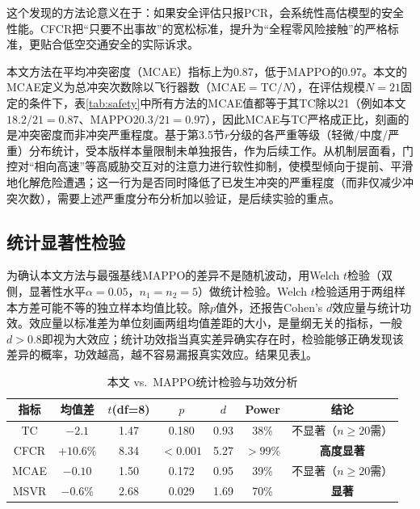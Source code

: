 \documentclass[12pt,a4paper,UTF8]{ctexart}
\begin{document}
这个发现的方法论意义在于：如果安全评估只报PCR，会系统性高估模型的安全性能。CFCR把“只要不出事故”的宽松标准，提升为“全程零风险接触”的严格标准，更贴合低空交通安全的实际诉求。

本文方法在平均冲突密度（MCAE）指标上为0.87，低于MAPPO的0.97。本文的MCAE定义为总冲突次数除以飞行器数（$\mathrm{MCAE}=\mathrm{TC}/N$），在评估规模$N=21$固定的条件下，表\ref{tab:safety}中所有方法的MCAE值都等于其TC除以21（例如本文$18.2/21=0.87$、MAPPO$20.3/21=0.97$），因此MCAE与TC严格成正比，刻画的是冲突密度而非冲突严重程度。基于第3.5节$r$分级的各严重等级（轻微/中度/严重）分布统计，受本版样本量限制未单独报告，作为后续工作。从机制层面看，门控对“相向高速”等高威胁交互对的注意力进行软性抑制，使模型倾向于提前、平滑地化解危险遭遇；这一行为是否同时降低了已发生冲突的严重程度（而非仅减少冲突次数），需要上述严重度分布分析加以验证，是后续实验的重点。

\subsection{统计显著性检验}

为确认本文方法与最强基线MAPPO的差异不是随机波动，用Welch $t$检验\cite{ref42}（双侧，显著性水平$\alpha=0.05$，$n_1=n_2=5$）做统计检验。Welch $t$检验适用于两组样本方差可能不等的独立样本均值比较。除$p$值外，还报告Cohen's $d$效应量\cite{ref43}与统计功效。效应量以标准差为单位刻画两组均值差距的大小，是量纲无关的指标，一般$d>0.8$即视为大效应；统计功效指当真实差异确实存在时，检验能够正确发现该差异的概率，功效越高，越不容易漏报真实效应。结果见表\ref{tab:ttest}。

\begin{table}[H]
    \centering
    \caption{本文 vs.\ MAPPO统计检验与功效分析}
    \label{tab:ttest}
    \begin{tabular}{|c|c|c|c|c|c|c|}
        \hline
        \textbf{指标} & \textbf{均值差} & \textbf{$t$(df=8)} & \textbf{$p$} & \textbf{$d$} & \textbf{Power} & \textbf{结论} \\
        \hline
        TC & $-2.1$ & 1.47 & 0.180 & 0.93 & 38\% & 不显著（$n\geq20$需） \\
        CFCR & $+10.6\%$ & 8.34 & $<0.001$ & 5.27 & $>99\%$ & \textbf{高度显著} \\
        MCAE & $-0.10$ & 1.50 & 0.172 & 0.95 & 39\% & 不显著（$n\geq20$需） \\
        MSVR & $-0.6\%$ & 2.68 & 0.029 & 1.69 & 70\% & \textbf{显著} \\
        \hline
    \end{tabular}
\end{table}
\end{document}
